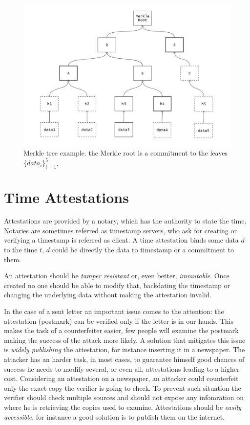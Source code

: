 \begin{figure}
	\begin{center}
		\includegraphics[width=\linewidth]{Images/merkle-tree.png}
		\caption[Merkle tree example]{Merkle tree example. the Merkle root is a commitment to the leaves $\{data_i\}_{i=1}^5$.}
		\label{fig:merkle-tree}
	\end{center}
\end{figure}

\section{Time Attestations}

Attestations are provided by a notary, which has the authority to state the time.
Notaries are sometimes referred as timestamp servers, who ask for creating or verifying a timestamp is referred as client.
A time attestation binds some data $d$ to the time $t$, $d$ could be directly the data to timestamp or a commitment to them. 

An attestation should be \textit{tamper resistant} or, even better, \textit{immutable}. Once created no one should be able to modify that, backdating the timestamp or changing the underlying data without making the attestation invalid.

In the case of a sent letter an important issue comes to the attention: the attestation (postmark) can be verified only if the letter is in our hands. This makes the task of a counterfeiter easier, few people will examine the postmark making the success of the attack more likely. A solution that mitigates this issue is \textit{widely publishing} the attestation, for instance inserting it in a newspaper. The attacker has an harder task, in most cases, to guarantee himself good chances of success he needs to modify several, or even all, attestations leading to a higher cost. Considering an attestation on a newspaper, an attacker could counterfeit only the exact copy the verifier is going to check. To prevent such situation the verifier should check multiple sources and should not expose any infomration on where he is retrieving the copies used to examine. Attestations should be \textit{easily accessible}, for instance a good solution is to publish them on the internet.

